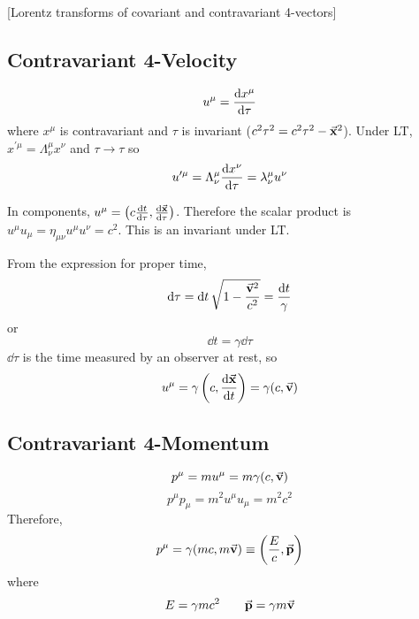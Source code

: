 \documentclass[a4paper,twoside,master.tex]{subfiles}
\begin{document}

[Lorentz transforms of covariant and contravariant 4-vectors]

\subsection{Contravariant 4-Velocity}\label{sub:contravariant_4-velocity}

\begin{equation}
    u^{\mu} = \dv{x^{\mu}}{\tau}
\end{equation}
where $ x^{\mu} $ is contravariant and $ \tau $ is invariant ($ c^2 \tau^2 = c^2 \tau^2 - \va{x}^2 $). Under LT, $ x^{\prime\mu} = \Lambda^{\mu}_{\nu} x^{\nu} $ and $ \tau \to \tau $ so
\begin{equation}
    u^{\prime\mu} = \Lambda^{\mu}_{\nu} \dv{x^{\nu}}{\tau} = \lambda^{\mu}_{\nu} u^{\nu}
\end{equation}

In components, $ u^{\mu} = \left( c \dv{t}{\tau}, \dv{\va{x}}{\tau} \right) $. Therefore the scalar product is $ u^{\mu} u_{\mu} = \eta_{\mu \nu} u^{\mu} u^{\nu} = c^2 $. This is an invariant under LT.


From the expression for proper time,
\begin{equation}
    \dd{\tau} = \dd{t} \sqrt{1 - \frac{\va{v}^2}{c^2}} = \frac{\dd{t}}{\gamma}
\end{equation}
or
\begin{equation}
    \dd{t} = \gamma \dd{\tau}
\end{equation}
$ \dd{\tau} $ is the time measured by an observer at rest, so
\begin{equation}
    u^{\mu} = \gamma \left( c, \dv{\va{x}}{t} \right) = \gamma (c, \va{v})
\end{equation}

\subsection{Contravariant 4-Momentum}\label{sub:contravariant_4-momentum}

\begin{equation}
    p^{\mu} = m u^{\mu} = m \gamma (c, \va{v})
\end{equation}
\begin{equation}
    p^{\mu} p_{\mu} = m^2 u^{\mu} u_{\mu} = m^2 c^2
\end{equation}
Therefore,
\begin{equation}
    p^{\mu} = \gamma (mc, m \va{v}) \equiv \left( \frac{E}{c}, \va{p} \right)
\end{equation}
where
\begin{equation}
    E = \gamma m c^2\qquad \va{p} = \gamma m \va{v}
\end{equation}
\end{document}
